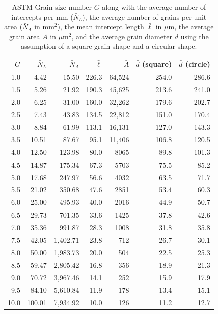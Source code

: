 \begin{table}[t]
\centering\leavevmode
\begin{tabular}{rrrrrrr}
$G$ & $\bar{N}_L$ & $\bar{N}_A$ & $\bar{\ell}$ & $\bar{A}$ & $\bar{d}$ (square) & $\bar{d}$ (circle)\\
\hline
 1.0&  4.42&  15.50&226.3&64,524&254.0&286.6\\
 1.5&  5.26&  21.92&190.3&45,625&213.6&241.0\\
 2.0&  6.25&  31.00&160.0&32,262&179.6&202.7\\
 2.5&  7.43&  43.83&134.5&22,812&151.0&170.4\\
 3.0&  8.84&  61.99&113.1&16,131&127.0&143.3\\
\hline
 3.5& 10.51&  87.67& 95.1&11,406&106.8&120.5\\
 4.0& 12.50& 123.98& 80.0& 8065& 89.8&101.3\\
 4.5& 14.87& 175.34& 67.3& 5703& 75.5& 85.2\\
 5.0& 17.68& 247.97& 56.6& 4032& 63.5& 71.7\\
 5.5& 21.02& 350.68& 47.6& 2851& 53.4& 60.3\\
\hline
 6.0& 25.00& 495.93& 40.0& 2016& 44.9& 50.7\\
 6.5& 29.73& 701.35& 33.6& 1425& 37.8& 42.6\\
 7.0& 35.36& 991.87& 28.3& 1008& 31.8& 35.8\\
 7.5& 42.05&1,402.71& 23.8&  712& 26.7& 30.1\\
 8.0& 50.00&1,983.73& 20.0&  504& 22.5& 25.3\\
\hline
 8.5& 59.47&2,805.42& 16.8&  356& 18.9& 21.3\\
 9.0& 70.72&3,967.46& 14.1&  252& 15.9& 17.9\\
 9.5& 84.10&5,610.84& 11.9&  178& 13.4& 15.1\\
10.0&100.01&7,934.92& 10.0&  126& 11.2& 12.7\\
\hline
\end{tabular}
\caption{\label{\chabbr:tb:ASTMtable}ASTM Grain size number $G$ along with the average number of intercepts per mm ($\bar{N}_L$), the average number of grains per unit area ($\bar{N}_A$ in mm$^2$), the mean intercept length $\bar{\ell}$ in $\mu$m, the average grain area $\bar{A}$ in $\mu$m$^2$, and the average grain diameter $\bar{d}$ using the assumption of a square grain shape and a circular shape.}
\end{table}



